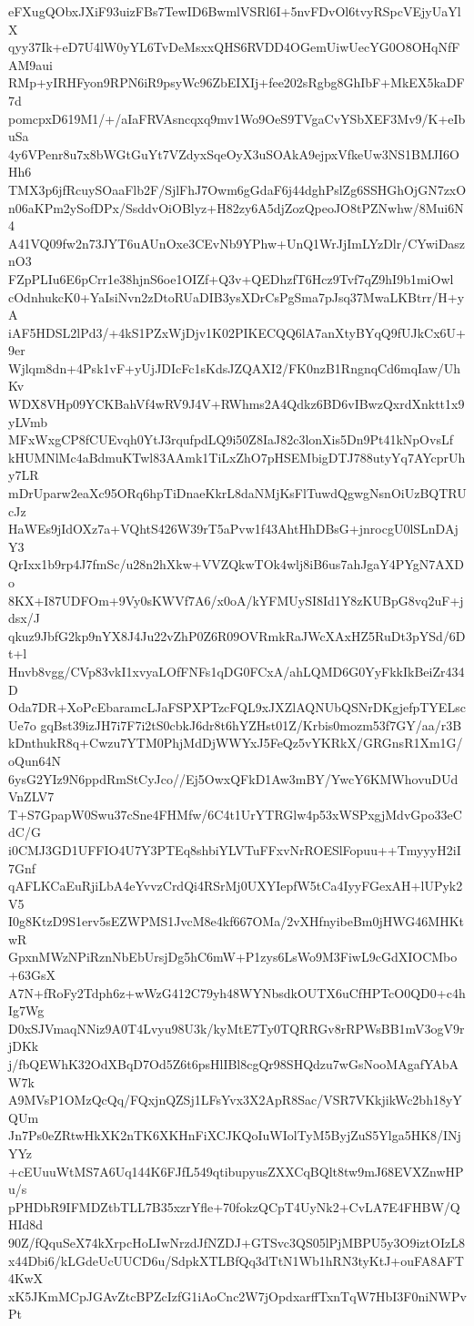 eFXugQObxJXiF93uizFBs7TewID6BwmlVSRl6I+5nvFDvOl6tvyRSpcVEjyUaYlX
qyy37Ik+eD7U4lW0yYL6TvDeMsxxQHS6RVDD4OGemUiwUecYG0O8OHqNfFAM9aui
RMp+yIRHFyon9RPN6iR9psyWc96ZbEIXIj+fee202sRgbg8GhIbF+MkEX5kaDF7d
pomcpxD619M1/+/aIaFRVAsncqxq9mv1Wo9OeS9TVgaCvYSbXEF3Mv9/K+eIbuSa
4y6VPenr8u7x8bWGtGuYt7VZdyxSqeOyX3uSOAkA9ejpxVfkeUw3NS1BMJI6OHh6
TMX3p6jfRcuySOaaFlb2F/SjlFhJ7Owm6gGdaF6j44dghPslZg6SSHGhOjGN7zxO
n06aKPm2ySofDPx/SsddvOiOBlyz+H82zy6A5djZozQpeoJO8tPZNwhw/8Mui6N4
A41VQ09fw2n73JYT6uAUnOxe3CEvNb9YPhw+UnQ1WrJjImLYzDlr/CYwiDasznO3
FZpPLIu6E6pCrr1e38hjnS6oe1OIZf+Q3v+QEDhzfT6Hcz9Tvf7qZ9hI9b1miOwl
cOdnhukcK0+YaIsiNvn2zDtoRUaDIB3ysXDrCsPgSma7pJsq37MwaLKBtrr/H+yA
iAF5HDSL2lPd3/+4kS1PZxWjDjv1K02PIKECQQ6lA7anXtyBYqQ9fUJkCx6U+9er
Wjlqm8dn+4Psk1vF+yUjJDIcFc1sKdsJZQAXI2/FK0nzB1RngnqCd6mqIaw/UhKv
WDX8VHp09YCKBahVf4wRV9J4V+RWhms2A4Qdkz6BD6vIBwzQxrdXnktt1x9yLVmb
MFxWxgCP8fCUEvqh0YtJ3rqufpdLQ9i50Z8IaJ82c3lonXis5Dn9Pt41kNpOvsLf
kHUMNlMc4aBdmuKTwl83AAmk1TiLxZhO7pHSEMbigDTJ788utyYq7AYcprUhy7LR
mDrUparw2eaXc95ORq6hpTiDnaeKkrL8daNMjKsFlTuwdQgwgNsnOiUzBQTRUcJz
HaWEs9jIdOXz7a+VQhtS426W39rT5aPvw1f43AhtHhDBsG+jnrocgU0lSLnDAjY3
QrIxx1b9rp4J7fmSc/u28n2hXkw+VVZQkwTOk4wlj8iB6us7ahJgaY4PYgN7AXDo
8KX+I87UDFOm+9Vy0sKWVf7A6/x0oA/kYFMUySI8Id1Y8zKUBpG8vq2uF+jdsx/J
qkuz9JbfG2kp9nYX8J4Ju22vZhP0Z6R09OVRmkRaJWcXAxHZ5RuDt3pYSd/6Dt+l
Hnvb8vgg/CVp83vkI1xvyaLOfFNFs1qDG0FCxA/ahLQMD6G0YyFkkIkBeiZr434D
Oda7DR+XoPcEbaramcLJaFSPXPTzcFQL9xJXZlAQNUbQSNrDKgjefpTYELscUe7o
gqBst39izJH7i7F7i2tS0cbkJ6dr8t6hYZHst01Z/Krbis0mozm53f7GY/aa/r3B
kDnthukR8q+Cwzu7YTM0PhjMdDjWWYxJ5FeQz5vYKRkX/GRGnsR1Xm1G/oQun64N
6ysG2YIz9N6ppdRmStCyJco//Ej5OwxQFkD1Aw3mBY/YwcY6KMWhovuDUdVnZLV7
T+S7GpapW0Swu37cSne4FHMfw/6C4t1UrYTRGlw4p53xWSPxgjMdvGpo33eCdC/G
i0CMJ3GD1UFFIO4U7Y3PTEq8shbiYLVTuFFxvNrROESlFopuu++TmyyyH2iI7Gnf
qAFLKCaEuRjiLbA4eYvvzCrdQi4RSrMj0UXYIepfW5tCa4IyyFGexAH+lUPyk2V5
I0g8KtzD9S1erv5sEZWPMS1JvcM8e4kf667OMa/2vXHfnyibeBm0jHWG46MHKtwR
GpxnMWzNPiRznNbEbUrsjDg5hC6mW+P1zys6LsWo9M3FiwL9cGdXIOCMbo+63GsX
A7N+fRoFy2Tdph6z+wWzG412C79yh48WYNbsdkOUTX6uCfHPTcO0QD0+c4hIg7Wg
D0xSJVmaqNNiz9A0T4Lvyu98U3k/kyMtE7Ty0TQRRGv8rRPWsBB1mV3ogV9rjDKk
j/fbQEWhK32OdXBqD7Od5Z6t6psHlIBl8cgQr98SHQdzu7wGsNooMAgafYAbAW7k
A9MVsP1OMzQcQq/FQxjnQZSj1LFsYvx3X2ApR8Sac/VSR7VKkjikWc2bh18yYQUm
Jn7Ps0eZRtwHkXK2nTK6XKHnFiXCJKQoIuWIolTyM5ByjZuS5Ylga5HK8/INjYYz
+cEUuuWtMS7A6Uq144K6FJfL549qtibupyusZXXCqBQlt8tw9mJ68EVXZnwHPu/s
pPHDbR9IFMDZtbTLL7B35xzrYfle+70fokzQCpT4UyNk2+CvLA7E4FHBW/QHId8d
90Z/fQquSeX74kXrpcHoLIwNrzdJfNZDJ+GTSvc3QS05lPjMBPU5y3O9iztOIzL8
x44Dbi6/kLGdeUcUUCD6u/SdpkXTLBfQq3dTtN1Wb1hRN3tyKtJ+ouFA8AFT4KwX
xK5JKmMCpJGAvZtcBPZcIzfG1iAoCnc2W7jOpdxarffTxnTqW7HbI3F0niNWPvPt
